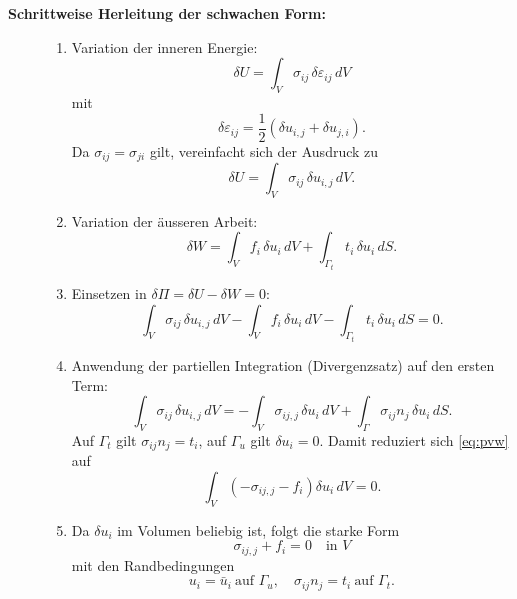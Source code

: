 \begin{description}
	\item[\textbf{Schrittweise Herleitung der schwachen Form:}]
	\begin{enumerate}
		\item Variation der inneren Energie:
		\begin{equation*}
			\delta U = 
			\int_V \sigma_{ij} \, \delta \varepsilon_{ij} \, dV
		\end{equation*}
		mit
		\begin{equation*}
			\delta \varepsilon_{ij} = 
			\frac{1}{2} \left( \delta u_{i,j} + \delta u_{j,i} \right).
		\end{equation*}
		Da $\sigma_{ij} = \sigma_{ji}$ gilt, vereinfacht sich der Ausdruck zu
		\begin{equation*}
			\delta U = 
			\int_V \sigma_{ij} \, \delta u_{i,j} \, dV.
		\end{equation*}
		
		\item Variation der äusseren Arbeit:
		\begin{equation*}
			\delta W = 
			\int_V f_i \, \delta u_i \, dV + \int_{\Gamma_t} t_i \, \delta u_i \, dS.
		\end{equation*}
		
		\item Einsetzen in $\delta\Pi = \delta U - \delta W = 0$:
		\begin{equation}
			\int_V \sigma_{ij} \, \delta u_{i,j} \, dV - \int_V f_i \, \delta u_i \, dV - \int_{\Gamma_t} t_i \, \delta u_i \, dS = 
			0.
			\label{eq:pvw}
		\end{equation}
		
		\item Anwendung der partiellen Integration
		(Divergenzsatz) auf den ersten Term:
		\begin{equation*}
			\int_V \sigma_{ij} \, \delta u_{i,j} \, dV 
			= -\int_V \sigma_{ij,j} \, \delta u_i \, dV + \int_{\Gamma} \sigma_{ij} n_j \, \delta u_i \, dS.
		\end{equation*}
		Auf $\Gamma_t$ gilt $\sigma_{ij} n_j = t_i$, auf $\Gamma_u$ gilt $\delta u_i = 0$. 
		Damit reduziert sich \eqref{eq:pvw} auf
		\begin{equation*}
			\int_V \left( -\sigma_{ij,j} - f_i \right) \delta u_i \, dV = 
			0.
		\end{equation*}
		
		\item Da $\delta u_i$ im Volumen beliebig ist, folgt
		die starke Form
		\begin{equation*}
			\sigma_{ij,j} + f_i = 
			0 \quad \text{in } V
		\end{equation*}
		mit den Randbedingungen
		\begin{equation*}
			u_i = \bar u_i \ \text{auf } \Gamma_u, \quad \sigma_{ij} n_j =
			t_i \ \text{auf } \Gamma_t.
		\end{equation*}
	\end{enumerate}
\end{description}

